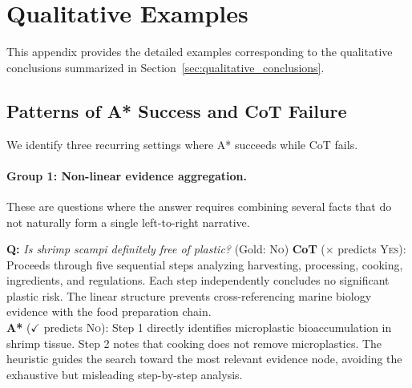 \documentclass[11pt]{article}
\begin{document}

\appendix







\section{Qualitative Examples}
\label{app:qualitative_examples}

This appendix provides the detailed examples corresponding to the qualitative conclusions summarized in Section~\ref{sec:qualitative_conclusions}.

\subsection{Patterns of A* Success and CoT Failure}
\label{app:astar_success}

We identify three recurring settings where A* succeeds while CoT fails.

\paragraph{Group 1: Non-linear evidence aggregation.}
These are questions where the answer requires combining several facts that do not naturally form a single left-to-right narrative.

\begin{examplebox}[title=StrategyQA --- Non-linear Evidence Aggregation]
\textbf{Q:} \emph{Is shrimp scampi definitely free of plastic?} \quad (Gold: \textsc{No})
\tcblower
\textbf{CoT} ($\times$ predicts \textsc{Yes}): Proceeds through five sequential steps analyzing harvesting, processing, cooking, ingredients, and regulations. Each step independently concludes no significant plastic risk. The linear structure prevents cross-referencing marine biology evidence with the food preparation chain.\\[4pt]
\textbf{A*} ($\checkmark$ predicts \textsc{No}): Step 1 directly identifies microplastic bioaccumulation in shrimp tissue. Step 2 notes that cooking does not remove microplastics. The heuristic guides the search toward the most relevant evidence node, avoiding the exhaustive but misleading step-by-step analysis.
\end{examplebox}
\end{document}
